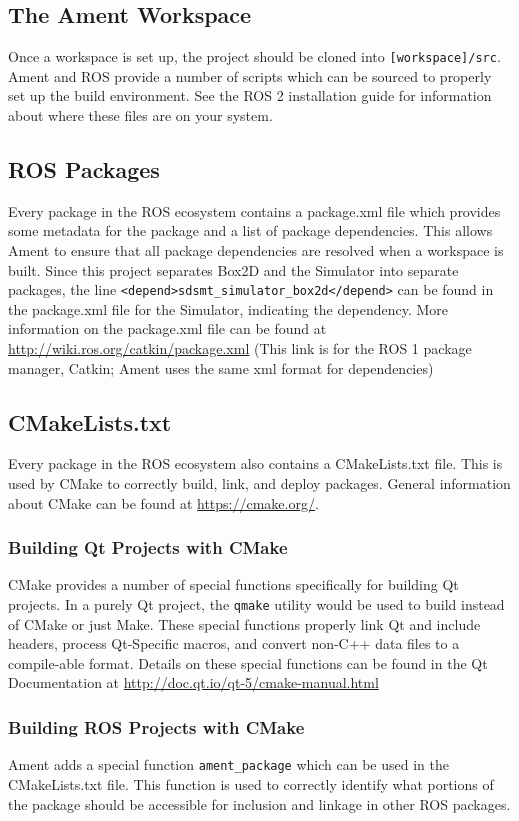 \subsection{The Ament Workspace}
Once a workspace is set up, the project should be cloned into \lstinline|[workspace]/src|.
Ament and ROS provide a number of scripts which can be sourced to properly set up the build environment. See the ROS 2 installation guide for information about where these files are on your system.

\subsection{ROS Packages}
Every package in the ROS ecosystem contains a package.xml file which provides some metadata for the package and a list of package dependencies. This allows Ament to ensure that all package dependencies are resolved when a workspace is built. Since this project separates Box2D and the Simulator into separate packages, the line \lstinline|<depend>sdsmt_simulator_box2d</depend>| can be found in the package.xml file for the Simulator, indicating the dependency.  More information on the package.xml file can be found at \url{http://wiki.ros.org/catkin/package.xml} (This link is for the ROS 1 package manager, Catkin; Ament uses the same xml format for dependencies)

\subsection{CMakeLists.txt}
Every package in the ROS ecosystem also contains a CMakeLists.txt file. This is used by CMake to correctly build, link, and deploy packages. General information about CMake can be found at \url{https://cmake.org/}.

\subsubsection*{Building Qt Projects with CMake}
CMake provides a number of special functions specifically for building Qt projects. In a purely Qt project, the \lstinline|qmake| utility would be used to build instead of CMake or just Make. These special functions properly link Qt and include headers, process Qt-Specific macros, and convert non-C++ data files to a compile-able format. Details on these special functions can be found in the Qt Documentation at \url{http://doc.qt.io/qt-5/cmake-manual.html}

\subsubsection*{Building ROS Projects with CMake}
Ament adds a special function \lstinline|ament_package| which can be used in the CMakeLists.txt file. This function is used to correctly identify what portions of the package should be accessible for inclusion and linkage in other ROS packages.

